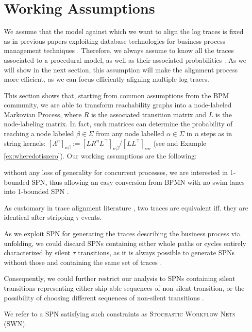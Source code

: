 \section{Working Assumptions}\label{sec:was}
We assume that the model against which we want to align the log traces is fixed as in previous papers exploiting database technologies for business process management techniques \cite{SchonigRCJM16}. Therefore, we always assume to know all the traces associated to a procedural model, as well as their associated probabilities \cite{AlizadehLZ14a}. As we will show in the next section, this assumption will make the alignment process more efficient, as we can focus efficiently aligning multiple log traces. 

This section shows that, starting from common assumptions from the BPM community, we are able to transform reachability graphs into a node-labeled Markovian Process, where  $R$ is the associated transition matrix and $L$ is the node-labeling matrix. In fact, such matrices can determine the probability of reaching a node labeled $\beta\in\Sigma$ from any node labelled $\alpha\in\Sigma$ in $n$ steps as in string kernels:   $[\Lambda^n]_{\alpha\beta}:=[LR^nL^\top]_{\alpha\beta}/[LL^\top]_{\alpha\alpha}$ (see \cite{GartnerFW03} and Example \ref{ex:wheredotiszero}). 
%
Our working assumptions are the following: \begin{mylist}
\item without any loss of generality for concurrent processes, we are interested in 1-bounded SPN, thus allowing an easy conversion from BPMN with no swim-lanes into 1-bounded SPN \cite{RaedtsPUWGS07}.
\item As customary in trace alignment literature \cite{DBLP:conf/edoc/AdriansyahDA11,LeoniM17}, two traces are equivalent iff. they are identical after stripping $\tau$ events.
\item As we exploit SPN for generating the traces describing the business process via unfolding, we could discard SPNs containing either whole paths or cycles entirely characterized by silent $\tau$ transitions, as it is always possible to generate SPNs without those and containing the same set of traces \cite{Bergami21}.
\item Consequently, we could further restrict our analysis to SPNs containing silent transitions representing either skip-able sequences of non-silent transition, or the possibility of choosing different sequences of non-silent transitions \cite{Bergami21}.
\end{mylist} We refer to a SPN satisfying such constraints as \textsc{Stochastic Workflow Nets} (SWN). 


